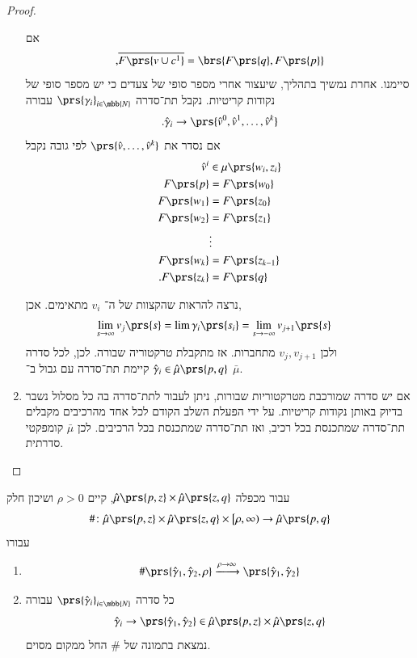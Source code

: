 \documentclass[a4paper,10pt,twoside,openany]{book}
\begin{document}
\begin{proof}
\begin{enumerate}
אם
\[\text{,} \overline{F\prs{v \cup c^1}} = \brs{F\prs{q}, F\prs{p}}\]
סיימנו.
אחרת נמשיך בתהליך, שיעצור אחרי מספר סופי של צעדים כי יש מספר סופי של נקודות קריטיות.
נקבל תת־סדרה
$\prs{\gamma_i}_{i \in \mbb{N}}$
עבורה
\[\text{.} \hat{\gamma}_i \to \prs{\hat{v}^0, \hat{v}^1, \ldots, \hat{v}^k}\]
אם נסדר את
$\prs{\hat{v}, \ldots, \hat{v}^k}$
לפי גובה נקבל
\begin{align*}
\hat{v}^i &\in \mu\prs{w_i, z_i} \\
F\prs{p} &= F\prs{w_0} \\
F\prs{w_1} &= F\prs{z_0} \\
F\prs{w_2} &= F\prs{z_1} \\
& \vdots \\
F\prs{w_k} &= F\prs{z_{k-1}} \\
\text{.} F\prs{z_k} &= F\prs{q}
\end{align*}

נרצה להראות שהקצוות של ה־%
$v_i$
מתאימים. אכן,
\begin{align*}
\lim_{s\to\infty} v_j\prs{s} &= \lim \gamma_i\prs{s_i} = \lim_{s \to -\infty} v_{j+1}\prs{s}
\end{align*}
ולכן
$v_j, v_{j+1}$
מתחברות.
אז מתקבלת טרקטוריה שבורה. לכן, לכל סדרה
$\hat{\gamma}_i \in \hat{\mu}\prs{p,q}$
קיימת תת־סדרה עם גבול ב־%
$\bar{\mu}$.

\item אם יש סדרה שמורכבת מטרקטוריות שבורות, ניתן לעבור לתת־סדרה בה כל מסלול נשבר בדיוק באותן נקודות קריטיות.
על ידי הפעלת השלב הקודם לכל אחד מהרכיבים מקבלים תת־סדרה שמתכנסת בכל רכיב, ואז תת־סדרה שמתכנסת בכל הרכיבים. לכן
$\bar{\mu}$
קומפקטי סדרתית.
\end{enumerate}
\end{proof}


\begin{theorem}[הדבקה]
עבור מכפלה
$\hat{\mu}\prs{p,z} \times \hat{\mu}\prs{z,q}$,
קיים
$\rho > 0$
ושיכון חלק
\[\# \colon \hat{\mu}\prs{p,z} \times \hat{\mu}\prs{z,q} \times \left[\rho,\infty\right) \to \hat{\mu}\prs{p,q}\]
עבורו
\begin{enumerate}[label = (\roman*)]
\item
\[\# \prs{\hat{\gamma}_1, \hat{\gamma}_2, \rho} \xrightarrow{\rho \to \infty} \prs{\hat{\gamma}_1, \hat{\gamma}_2}\]
\item 
כל סדרה
$\prs{\hat{\gamma}_i}_{i \in \mbb{N}}$
עבורה
\[\hat{\gamma}_i \to \prs{\hat{\gamma}_1, \hat{\gamma}_2} \in \hat{\mu}\prs{p,z} \times \hat{\mu}\prs{z,q}\]
נמצאת בתמונה של
$\#$
החל ממקום מסוים.
\end{enumerate}
\end{theorem}
\end{document}
